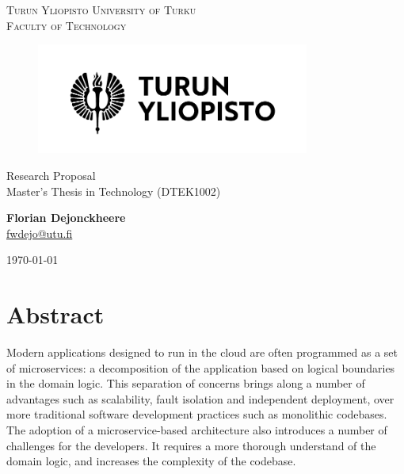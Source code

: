 \documentclass[12pt]{article}
\makeatletter
\newcommand{\faculty}{Faculty of Technology}
\newcommand{\course}{Master's Thesis in Technology (DTEK1002)}
\newcommand{\documenttitle}{Research Proposal}
\newcommand{\authorname}{Florian Dejonckheere}
\newcommand{\authoremail}{fwdejo@utu.fi}
\newcommand{\documentdate}{\today}
\makeatother
\begin{document}
	\begin{titlepage}
		\begin{center}
			\textsc{Turun Yliopisto \textemdash \hspace{1mm} University of Turku} \\
			\textsc{\faculty}
		\end{center}
		\begin{figure}[h]
			\vspace{10mm}

			\centering\includegraphics[width=0.8\textwidth]{logo-fi}

			\vspace{20mm}\label{fig:logo}
		\end{figure}
		\begin{center}
			\fontsize{10mm}{7mm}\selectfont
			\textup{\documenttitle} \\
			\textnormal{\Large{\course}} \\

			\vspace{25mm}

			\large{\textbf{\authorname}} \\
			\large{\href{mailto:\authoremail}{\authoremail}} \\

			\vspace{35mm}

			\documentdate
		\end{center}
	\end{titlepage}

	\clearpage


	\tableofcontents

	\cleardoublepage


	\section{Abstract}\label{sec:abstract}

	Modern applications designed to run in the cloud are often programmed as a set of microservices: a decomposition of the application based on logical boundaries in the domain logic.
	This separation of concerns brings along a number of advantages such as scalability, fault isolation and independent deployment, over more traditional software development practices such as monolithic codebases.
	The adoption of a microservice-based architecture also introduces a number of challenges for the developers.
	It requires a more thorough understand of the domain logic, and increases the complexity of the codebase.
\end{document}
